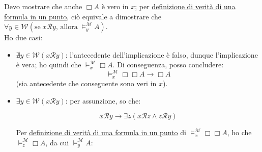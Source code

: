 \documentclass[a4paper,12pt]{article}
\begin{document}
\begin{dimo}
\begin{enumerate}
		      Devo mostrare che anche $\Box A$ è vero in $x$; per \hyperlink{defverp}{definizione di verità di una formula in un punto}, ciò equivale a dimostrare che $\forall y \in \mathcal{W} (\text{se} \; x\mathcal{R}y  \text{, allora} \; \vDash_y^{\mathcal{M}} A)$. \\
		      Ho due casi:
		      \begin{itemize}
			      \item $\nexists y \in \mathcal{W} (x\mathcal{R}y)$: l'antecedente dell'implicazione è falso, dunque l'implicazione è vera; ho quindi che $\vDash_x^{\mathcal{M}} \Box A$. Di conseguenza, posso concludere:
			            $$\vDash_x^{\mathcal{M}} \Box \Box A \to \Box A$$
			            (sia antecedente che conseguente sono veri in $x$).
			      \item $\exists y \in \mathcal{W} (x\mathcal{R}y)$: per assunzione, so che: \\
			            \begin{minipage}{0.48\textwidth}
				            $$x\mathcal{R}y \to \exists z(x\mathcal{R}z \land z\mathcal{R}y)$$
			            \end{minipage}
			            \begin{minipage}{0.48\textwidth}
				            \begin{center}
				            \end{center}
			            \end{minipage}
			            \vspace{0pt}

			            Per \hyperlink{defverp}{definizione di verità di una formula in un punto} di $\vDash_x^{\mathcal{M}} \Box \Box A$, ho che $\vDash_z^{\mathcal{M}} \Box A$, da cui $\vDash_y^{\mathcal{M}}A$:


\end{itemize}
\end{enumerate}
\end{dimo}
\end{document}
